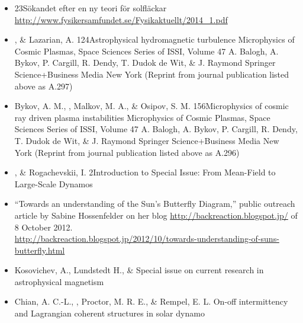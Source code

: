 \begin{itemize}
\item[{39.}~]
\Brandenburg{}
{23}{S\"okandet efter en ny teori f\"or solfl\"ackar}\\
\url{http://www.fysikersamfundet.se/Fysikaktuellt/2014_1.pdf}

\item[{38.}~]
\Brandenburg, \& Lazarian, A.
{124}{Astrophysical hydromagnetic turbulence}
{Microphysics of Cosmic Plasmas, Space Sciences Series of ISSI, Volume 47}
{A. Balogh, A. Bykov, P. Cargill, R. Dendy, T. Dudok de Wit, \& J. Raymond}
{Springer Science+Business Media New York}
(Reprint from journal publication listed above as A.297)

\item[{37.}~]
Bykov, A. M., \Brandenburg, Malkov, M. A., \& Osipov, S. M.
{156}{Microphysics of cosmic ray driven plasma instabilities}
{Microphysics of Cosmic Plasmas, Space Sciences Series of ISSI, Volume 47}
{A. Balogh, A. Bykov, P. Cargill, R. Dendy, T. Dudok de Wit, \& J. Raymond}
{Springer Science+Business Media New York}
(Reprint from journal publication listed above as A.296)

\item[36.]
\Brandenburg, \& Rogachevskii, I.
{2}{Introduction to Special Issue: From Mean-Field to Large-Scale Dynamos}

\item[35.]
``Towards an understanding of the Sun's Butterfly Diagram,''
public outreach article by Sabine Hossenfelder on her blog
\url{http://backreaction.blogspot.jp/} of 8 October 2012.\\
\url{http://backreaction.blogspot.jp/2012/10/towards-understanding-of-suns-butterfly.html}

\item[34.]
Kosovichev, A., Lundstedt H., \& \Brandenburg{}
{Special issue on current research in astrophysical magnetism}

\item[33.]
Chian, A. C.-L., \Brandenburg, Proctor, M. R. E., \& Rempel, E. L.
{On-off intermittency and Lagrangian coherent structures in solar dynamo}


\end{itemize}
